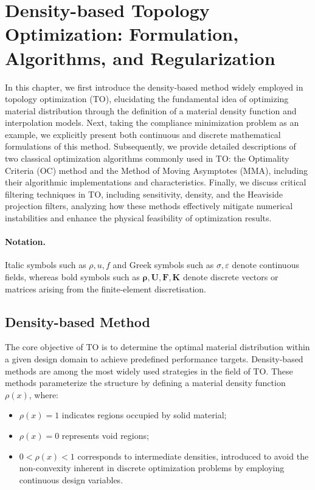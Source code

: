\documentclass[mathpazo]{cicp}
\begin{document}
\section{Density-based Topology Optimization: Formulation, Algorithms, and Regularization}\label{sec:math}
In this chapter, we first introduce the density-based method widely employed in topology optimization (TO), elucidating the fundamental idea of optimizing material distribution through the definition of a material density function and interpolation models. Next, taking the compliance minimization problem as an example, we explicitly present both continuous and discrete mathematical formulations of this method. Subsequently, we provide detailed descriptions of two classical optimization algorithms commonly used in TO: the Optimality Criteria (OC) method and the Method of Moving Asymptotes (MMA), including their algorithmic implementations and characteristics. Finally, we discuss critical filtering techniques in TO, including sensitivity, density, and the Heaviside projection filters, analyzing how these methods effectively mitigate numerical instabilities and enhance the physical feasibility of optimization results.
\paragraph{Notation.}Italic symbols such as $\rho, u, f$ and Greek symbols such as $\sigma, \varepsilon$ denote continuous fields, whereas
bold symbols such as $\boldsymbol{\rho}, \mathbf{U}, \mathbf{F}, \mathbf{K}$ denote discrete vectors or matrices arising from the finite-element discretisation.

\subsection{Density-based Method}\label{sec:DbM}
The core objective of TO is to determine the optimal material distribution within a given design domain to achieve predefined performance targets. Density-based methods are among the most widely used strategies in the field of TO. These methods parameterize the structure by defining a material density function $\rho(x)$, where:
\begin{itemize}
	\item $\rho(x) = 1$ indicates regions occupied by solid material;
	\item $\rho(x) = 0$ represents void regions;
	\item $0 < \rho(x) < 1$ corresponds to intermediate densities, introduced to avoid the non-convexity inherent in discrete optimization problems by employing continuous design variables.
\end{itemize}
\end{document}
